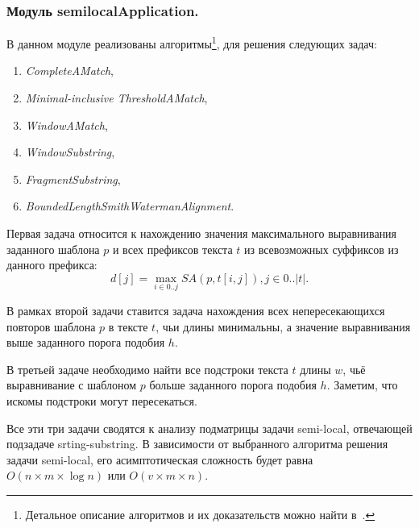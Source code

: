 \subsubsection{Модуль semilocalApplication.}
В данном модуле реализованы алгоритмы\footnote{Детальное описание алгоритмов и их доказательств можно найти в~\cite{tiskin2006all}.}, для решения следующих задач:
\begin{enumerate}
    \item \emph{CompleteAMatch},
    \item \emph{Minimal-inclusive ThresholdAMatch},
    \item \emph{WindowAMatch},
    \item \emph{WindowSubstring},
    \item \emph{FragmentSubstring},
    \item \emph{BoundedLengthSmithWatermanAlignment}.
\end{enumerate}

Первая задача относится к нахождению значения максимального выравнивания заданного шаблона $p$ и всех префиксов текста $t$ из всевозможных суффиксов из данного префикса:
\begin{equation}
    d[j] = \max _{i \in 0 ..j} SA(p,t[i,j]), j \in 0..|t|.
\end{equation}

В рамках второй задачи ставится задача нахождения всех непересекающихся повторов шаблона $p$ в тексте $t$, чьи длины минимальны, а значение выравнивания выше заданного порога подобия $h$.

В третьей задаче необходимо найти все подстроки текста $t$ длины $w$, чьё выравнивание с шаблоном $p$ больше заданного порога подобия $h$. Заметим, что искомы подстроки могут пересекаться.

Все эти три задачи сводятся к анализу подматрицы задачи {semi-local}, отвечающей подзадаче {srting-substring}.
В зависимости от выбранного алгоритма решения задачи {semi-local}, его асимптотическая сложность будет равна $O(n \times m \times \log n)$ или $O(v \times  m \times n)$.

